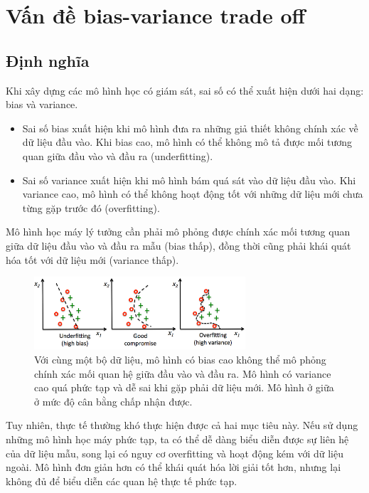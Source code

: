 \documentclass[12pt]{extreport}
\begin{document}
\section{Vấn đề bias-variance trade off}

\subsection{Định nghĩa}

Khi xây dựng các mô hình học có giám sát, sai số có thể xuất hiện dưới hai dạng: bias và variance.

\begin{itemize}
    \item Sai số bias xuất hiện khi mô hình đưa ra những giả thiết không chính xác về dữ liệu đầu vào. Khi bias cao, mô hình có thể không mô tả được mối tương quan giữa đầu vào và đầu ra (underfitting).
    \item Sai số variance xuất hiện khi mô hình bám quá sát vào dữ liệu đầu vào. Khi variance cao, mô hình có thể không hoạt động tốt với những dữ liệu mới chưa từng gặp trước đó (overfitting).
\end{itemize}

Mô hình học máy lý tưởng cần phải mô phỏng được chính xác mối tương quan giữa dữ liệu đầu vào và đầu ra mẫu (bias thấp), đồng thời cũng phải khái quát hóa tốt với dữ liệu mới (variance thấp).

\begin{figure}[H]
    \centering
    \includegraphics[width=0.7\textwidth]{figure2}
    \caption{Với cùng một bộ dữ liệu, mô hình có bias cao không thể mô phỏng chính xác mối quan hệ giữa đầu vào và đầu ra. Mô hình có variance cao quá phức tạp và dễ sai khi gặp phải dữ liệu mới. Mô hình ở giữa ở mức độ cân bằng chấp nhận được.}
\end{figure}

Tuy nhiên, thực tế thường khó thực hiện được cả hai mục tiêu này. Nếu sử dụng những mô hình học máy phức tạp, ta có thể dễ dàng biểu diễn được sự liên hệ của dữ liệu mẫu, song lại có nguy cơ overfitting và hoạt động kém với dữ liệu ngoài. Mô hình đơn giản hơn có thể khái quát hóa lời giải tốt hơn, nhưng lại không đủ để biểu diễn các quan hệ thực tế phức tạp.
\end{document}
